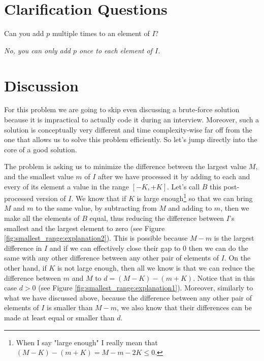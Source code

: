 \section{Clarification Questions}

\begin{QandA}
	\item Can you add $p$ multiple times to an element of $I$?
	\begin{answered}
		\textit{No, you can only add $p$ once to each element of $I$.}
	\end{answered}	
\end{QandA}

\section{Discussion}
\label{smallest_range:sec:discussion}
For this problem we are going to skip even discussing a brute-force solution because it is
impractical to actually code it during an interview. Moreover, such a solution is conceptually very
different and time complexity-wise far off from the one that allows us to solve this problem efficiently.
So let's jump directly into the core of a good solution.

The problem is asking us to minimize the difference between the largest value $M$, and the smallest
value $m$ of $I$ after we have processed it by adding to each and every of its element a
value in the range $[-K,+K]$. 
Let's call $B$ this post-processed version of $I$. 
We know that if $K$ is large enough\footnote{When I say "large enough" I really mean that 
$(M-K) - (m+K) = M-m-2K \leq 0$.} so that we can bring $M$ and $m$ to the same value,
by subtracting from $M$ and adding to $m$, then we make all the elements of $B$ equal,
thus reducing the difference between $I$'s smallest and
the largest element to zero (see Figure \ref{fig:smallest_range:explanation2}).
This is possible because $M-m$ is the  largest difference in $I$ and if we can effectively close their gap to $0$
then we can do the same with any other difference between any other pair of elements of $I$.
On the other hand, if $K$ is not large enough, then all we know
is that we can reduce the difference between $m$ and $M$ to $d=(M-K)-(m+K)$.
Notice that in this case $d > 0$  (see Figure \ref{fig:smallest_range:explanation1}).
Moreover, similarly to what we have discussed above, because the difference between any other pair of elements of $I$ is smaller than $M-m$, we also know that their
differences can be made at least  equal or smaller  than $d$.


